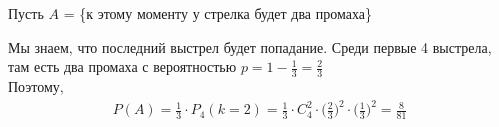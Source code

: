 \begin{exercise}[15]
	Пусть $A$ = \{к этому моменту у стрелка будет два промаха\}
	
	Мы знаем, что последний выстрел будет попадание. Среди первые 4 выстрела, там есть два промаха с вероятностью $p=1-\frac{1}{3} = \frac{2}{3}$ \\ Поэтому,
	\begin{align*}
		P(A) = \frac{1}{3} \cdot P_4(k=2) = \frac{1}{3} \cdot C^2_4 \cdot \Big(\frac{2}{3}\Big)^2 \cdot \Big(\frac{1}{3}\Big)^2 = \frac{8}{81}
	\end{align*}
\end{exercise}